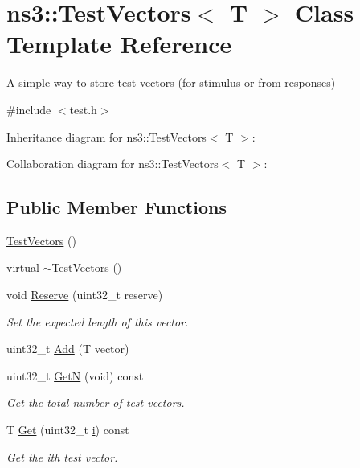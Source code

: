 \hypertarget{classns3_1_1TestVectors}{}\section{ns3\+:\+:Test\+Vectors$<$ T $>$ Class Template Reference}
\label{classns3_1_1TestVectors}


A simple way to store test vectors (for stimulus or from responses)  




{\ttfamily \#include $<$test.\+h$>$}



Inheritance diagram for ns3\+:\+:Test\+Vectors$<$ T $>$\+:


Collaboration diagram for ns3\+:\+:Test\+Vectors$<$ T $>$\+:
\subsection*{Public Member Functions}
\begin{DoxyCompactItemize}
\item 
\hyperlink{classns3_1_1TestVectors_aa41edfe40292bf1c8c40fb52ecaa1fd1}{Test\+Vectors} ()
\item 
virtual \hyperlink{classns3_1_1TestVectors_af7b8b5fd13ee336f28f24cdd737fcabf}{$\sim$\+Test\+Vectors} ()
\item 
void \hyperlink{classns3_1_1TestVectors_ab97f16f3958b8d64ad0bc8270cb5c2de}{Reserve} (uint32\+\_\+t reserve)
\begin{DoxyCompactList}\small\item\em Set the expected length of this vector. \end{DoxyCompactList}\item 
uint32\+\_\+t \hyperlink{classns3_1_1TestVectors_a59ceaabfb75eb96a93f607405868bfc0}{Add} (T vector)
\item 
uint32\+\_\+t \hyperlink{classns3_1_1TestVectors_a2da99bd673577006c95a8b17b550d809}{GetN} (void) const 
\begin{DoxyCompactList}\small\item\em Get the total number of test vectors. \end{DoxyCompactList}\item 
T \hyperlink{classns3_1_1TestVectors_acbb2624ad8cf403a44aa77c0ee3db85d}{Get} (uint32\+\_\+t \hyperlink{lte__uplink__power__control_8m_a6f6ccfcf58b31cb6412107d9d5281426}{i}) const 
\begin{DoxyCompactList}\small\item\em Get the i\textquotesingle{}th test vector. \end{DoxyCompactList}\end{DoxyCompactItemize}
